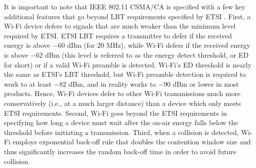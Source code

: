 It is important to note that IEEE 802.11 CSMA/CA is specified with a few key additional features that go beyond LBT requirements specified by ETSI \cite{LBT-ETSI-2014}. First, a Wi-Fi device defers to signals that are much weaker than the minimum level required by ETSI. ETSI LBT requires a transmitter to defer if the received energy is above $-60$ dBm (for $20$ MHz), while Wi-Fi defers if the received energy is above $-62$ dBm (this level is referred to as the energy detect threshold, or ED for short) or if a valid Wi-Fi preamble is detected. Wi-Fi's ED threshold is nearly the same as ETSI's LBT threshold, but Wi-Fi preamble detection is required to work to at least $-82$ dBm, and in reality works to $-90$ dBm or lower in most products. Hence, Wi-Fi devices defer to other Wi-Fi transmissions much more conservatively (i.e., at a much larger distance) than a device which only meets ETSI requirements. Second, Wi-Fi goes beyond the ETSI requirements in specifying how long a device must wait after the on-air energy falls below the threshold before initiating a transmission. Third, when a collision is detected, Wi-Fi employs exponential back-off rule that doubles the contention window size and thus significantly increases the random back-off time in order to avoid future collision.

